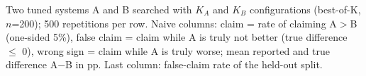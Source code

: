 Two tuned systems A and B searched with $K_A$ and $K_B$ configurations (best-of-K, $n$=200); 500 repetitions per row. Naive columns: claim = rate of claiming A$>$B (one-sided 5\%), false claim = claim while A is truly not better (true difference $\le$ 0), wrong sign = claim while A is truly worse; mean reported and true difference A$-$B in pp. Last column: false-claim rate of the held-out split.
